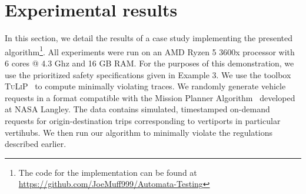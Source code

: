 \section{Experimental results}\label{sec:UAM-NFM-experiments}
In this section, we detail the results of a case study implementing the presented algorithm\footnote{The code for the implementation can be found at \url{https://github.com/JoeMuff999/Automata-Testing}}. All experiments were run on an AMD Ryzen 5 3600x processor with 6 cores @ 4.3 Ghz and 16 GB RAM. For the purposes of this demonstration, we use the prioritized safety specifications given in Example 3. We use the toolbox \textsc{TuLiP}~\cite{wongpiromsarn2011tulip} to compute minimally violating traces. 
We randomly generate vehicle requests in a format compatible with the Mission Planner Algorithm~\cite{guerreiro2019mission} developed at NASA Langley. The data contains simulated, timestamped on-demand requests for origin-destination trips corresponding to vertiports in particular vertihubs. We then run our algorithm to minimally violate the regulations described earlier.

